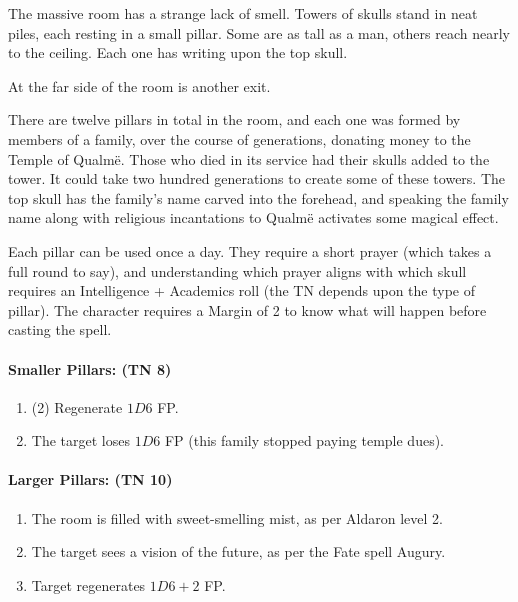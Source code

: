\begin{multicols}{2}
\begin{boxtext}

	The massive room has a strange lack of smell.  Towers of skulls stand in neat piles, each resting in a small pillar.  Some are as tall as a man, others reach nearly to the ceiling.  Each one has writing upon the top skull.

	At the far side of the room is another exit.

\end{boxtext}

There are twelve pillars in total in the room, and each one was formed by members of a family, over the course of generations, donating money to the Temple of Qualm\"{e}.  Those who died in its service had their skulls added to the tower.  It could take two hundred generations to create some of these towers.  The top skull has the family's name carved into the forehead, and speaking the family name along with religious incantations to Qualm\"{e} activates some magical effect.

Each pillar can be used once a day.  They require a short prayer (which takes a full round to say), and understanding which prayer aligns with which skull requires an Intelligence + Academics roll (the TN depends upon the type of pillar).  The character requires a Margin of 2 to know what will happen before casting the spell.

\paragraph{Smaller Pillars: (TN 8)}

\begin{enumerate}

	\item{(2) Regenerate $1D6$ FP.}
	\item{The target loses $1D6$ FP (this family stopped paying temple dues).}
\end{enumerate}

\paragraph{Larger Pillars: (TN 10)}

\begin{enumerate}

	\item{The room is filled with sweet-smelling mist, as per Aldaron level 2.}
	\item{The target sees a vision of the future, as per the Fate spell Augury.}
	\item{Target regenerates $1D6+2$ FP.}
\end{enumerate}


\end{multicols}
